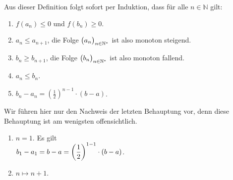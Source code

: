 Aus dieser Definition folgt sofort per Induktion, dass f\"ur alle $n\in\mathbb{N}$ gilt:
\begin{enumerate}
\item $f(a_n) \leq 0$ \quad und \quad $f(b_n) \geq 0$.
\item $a_n \leq a_{n+1}$, \quad die Folge $\bigl(a_n\bigr)_{n\in\mathbb{N}^*}$ ist also monoton
      steigend.
\item $b_n \geq b_{n+1}$, \quad die Folge $\bigl(b_n\bigr)_{n\in\mathbb{N}^*}$ ist also monoton
      fallend.
\item $a_n \leq b_n$.
\item $\displaystyle b_n - a_n = \left(\frac{1}{2}\right)^{n-1} \cdot (b - a)$.
\end{enumerate}
Wir f\"uhren hier nur den Nachweis der letzten Behauptung vor, denn diese Behauptung
ist am wenigsten offensichtlich.
\begin{enumerate}
\item[I.A.:] $n = 1$. Es gilt 
      \\[0.2cm]
      \hspace*{1.3cm}
      $\displaystyle b_1 - a_1 = b - a = \left(\frac{1}{2}\right)^{1-1} \cdot (b-a)$.
\item[I.S.:] $n \mapsto n+1$.  


\end{enumerate}
